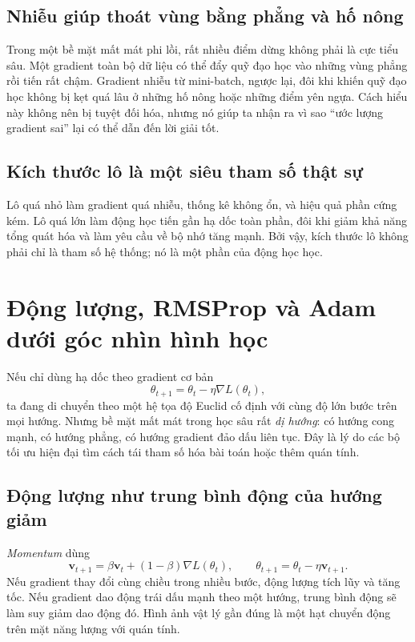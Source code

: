 \subsection{Nhiễu giúp thoát vùng bằng phẳng và hố nông}

Trong một bề mặt mất mát phi lồi, rất nhiều điểm dừng không phải là cực tiểu sâu. Một gradient toàn bộ dữ liệu có thể đẩy quỹ đạo học vào những vùng phẳng rồi tiến rất chậm. Gradient nhiễu từ mini-batch, ngược lại, đôi khi khiến quỹ đạo học không bị kẹt quá lâu ở những hố nông hoặc những điểm yên ngựa. Cách hiểu này không nên bị tuyệt đối hóa, nhưng nó giúp ta nhận ra vì sao ``ước lượng gradient sai'' lại có thể dẫn đến lời giải tốt.

\subsection{Kích thước lô là một siêu tham số thật sự}

Lô quá nhỏ làm gradient quá nhiễu, thống kê không ổn, và hiệu quả phần cứng kém. Lô quá lớn làm động học tiến gần hạ dốc toàn phần, đôi khi giảm khả năng tổng quát hóa và làm yêu cầu về bộ nhớ tăng mạnh. Bởi vậy, kích thước lô không phải chỉ là tham số hệ thống; nó là một phần của động học học.

\section{Động lượng, RMSProp và Adam dưới góc nhìn hình học}

Nếu chỉ dùng hạ dốc theo gradient cơ bản
\[
\theta_{t+1}=\theta_t-\eta \nabla L(\theta_t),
\]
ta đang di chuyển theo một hệ tọa độ Euclid cố định với cùng độ lớn bước trên mọi hướng. Nhưng bề mặt mất mát trong học sâu rất \emph{dị hướng}: có hướng cong mạnh, có hướng phẳng, có hướng gradient đảo dấu liên tục. Đây là lý do các bộ tối ưu hiện đại tìm cách tái tham số hóa bài toán hoặc thêm quán tính.

\subsection{Động lượng như trung bình động của hướng giảm}

\emph{Momentum} dùng
\[
\bm{v}_{t+1}=\beta \bm{v}_t + (1-\beta)\nabla L(\theta_t),
\qquad
\theta_{t+1}=\theta_t-\eta \bm{v}_{t+1}.
\]
Nếu gradient thay đổi cùng chiều trong nhiều bước, động lượng tích lũy và tăng tốc. Nếu gradient dao động trái dấu mạnh theo một hướng, trung bình động sẽ làm suy giảm dao động đó. Hình ảnh vật lý gần đúng là một hạt chuyển động trên mặt năng lượng với quán tính.

